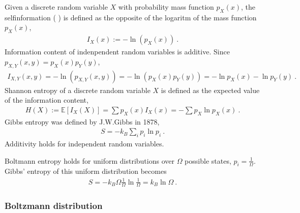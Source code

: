 \documentclass[letterpaper,10pt,english]{jupyterBook}
\begin{document}
\sphinxAtStartPar
Given a discrete random variable \(X\) with probability mass function \(p_X(x)\), the self\sphinxhyphen{}information ( ) is defined as the opposite of the logaritm of the mass function \(p_X(x)\),
\begin{equation*}
\begin{split}I_X(x) := - \ln \left( p_X(x) \right) \ .\end{split}
\end{equation*}
\sphinxAtStartPar
Information content of indenpendent random variables is additive. Since \(p_{X,Y}(x,y) = p_X(x) p_Y(y)\),
\begin{equation*}
\begin{split}I_{X,Y}(x,y) = - \ln \left( p_{X,Y}(x,y) \right) = -\ln \left( p_X(x) p_Y(y) \right) = - \ln p_X(x) - \ln p_Y(y) \ .\end{split}
\end{equation*}
\sphinxAtStartPar
{} Shannon entropy of a discrete random variable \(X\) is defined as the expected value of the information content,
\begin{equation*}
\begin{split}H(X) := \mathbb{E}[ I_X(X)] = \sum p_X(x) I_X(x) = - \sum p_X \ln p_X(x) \ .\end{split}
\end{equation*}
\sphinxAtStartPar
{} Gibbs entropy was defined by J.W.Gibbs in 1878,
\begin{equation*}
\begin{split}S = - k_B \sum_i p_i \ln p_i \ .\end{split}
\end{equation*}
\sphinxAtStartPar
Additivity holds for independent random variables.

\sphinxAtStartPar
{} Boltmann entropy holds for uniform distributions over \(\Omega\) possible states, \(p_i = \frac{1}{\Omega}\). Gibbs’ entropy of this uniform distribution becomes
\begin{equation*}
\begin{split}S = - k_B \Omega \frac{1}{\Omega} \ln \frac{1}{\Omega} = k_B \ln \Omega \ .\end{split}
\end{equation*}
\sphinxAtStartPar
{} 
\subsubsection*{Boltzmann distribution}
\end{document}
